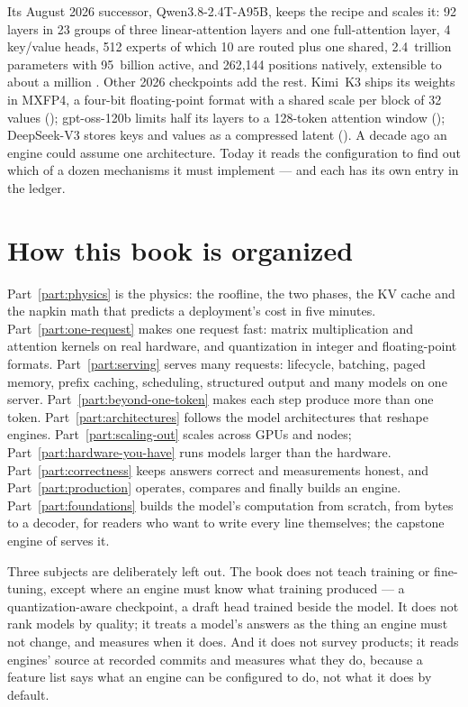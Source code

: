 Its August 2026 successor, Qwen3.8-2.4T-A95B, keeps the recipe and scales it:
92 layers in 23 groups of three linear-attention layers and one full-attention
layer, 4 key/value heads, 512 experts of which 10 are routed plus one shared,
2.4~trillion parameters with 95~billion active, and 262,144 positions natively,
extensible to about a million \cite{qwen2026qwen38}. Other 2026 checkpoints add
the rest. Kimi~K3 ships its weights in MXFP4, a four-bit floating-point format
with a shared scale per block of 32 values \cite{moonshot2026kimik3}
(); gpt-oss-120b limits half its layers to a
128-token attention window \cite{openai2025gptoss} ();
DeepSeek-V3 stores keys and values as a compressed latent \cite{deepseek2024v3}
(). A decade ago an engine could assume one architecture.
Today it reads the configuration to find out which of a dozen mechanisms it
must implement --- and each has its own entry in the ledger.

\section{How this book is organized}

Part~\ref{part:physics} is the physics: the roofline, the two phases, the KV
cache and the napkin math that predicts a deployment's cost in five minutes.
Part~\ref{part:one-request} makes one request fast: matrix multiplication and
attention kernels on real hardware, and quantization in integer and
floating-point formats. Part~\ref{part:serving} serves many requests:
lifecycle, batching, paged memory, prefix caching, scheduling, structured
output and many models on one server. Part~\ref{part:beyond-one-token} makes
each step produce more than one token. Part~\ref{part:architectures} follows
the model architectures that reshape engines. Part~\ref{part:scaling-out}
scales across GPUs and nodes; Part~\ref{part:hardware-you-have} runs models
larger than the hardware. Part~\ref{part:correctness} keeps answers correct
and measurements honest, and Part~\ref{part:production} operates, compares and
finally builds an engine. Part~\ref{part:foundations} builds the model's
computation from scratch, from bytes to a decoder, for readers who want to
write every line themselves; the capstone engine of  serves it.

Three subjects are deliberately left out. The book does not teach training or
fine-tuning, except where an engine must know what training produced --- a
quantization-aware checkpoint, a draft head trained beside the model. It does not
rank models by quality; it treats a model's answers as the thing an engine must
not change, and measures when it does. And it does not survey products; it reads
engines' source at recorded commits and measures what they do, because a
feature list says what an engine can be configured to do, not what it does by
default.


